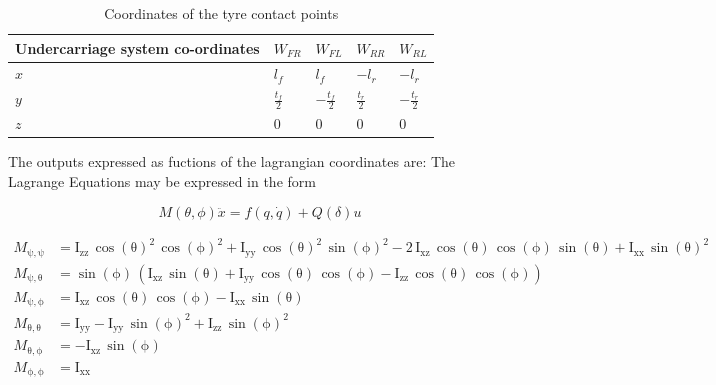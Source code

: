 \begin{table}[ht]
  \caption{Coordinates of the tyre contact points} %
  \centering %
  \begin{tabular}{l l l l l} %
    \hline\hline %
    Undercarriage system co-ordinates & $W_{FR}$ & $W_{FL}$ & $W_{RR}$ & $W_{RL}$ \\ [0.5ex] %
    \hline %
    $ x$ & $ l_f$ & $ l_f$ & $-l_r $ & $-l_r $\\ %
    $ y$ & $ \frac{t_f}{2} $ & $ -\frac{t_f}{2}$ & $ \frac{t_r}{2}$ & $ -\frac{t_r}{2}$\\ %
    $ z$ & $ 0 $& $ 0 $ & $ 0$ & $ 0$ \\ [1ex] %
    \hline %
  \end{tabular}
  \label{table:contactpoints} %
\end{table}

The outputs expressed as fuctions of the lagrangian coordinates are:
The Lagrange Equations may be expressed in the form

$$M(\theta,\phi)\ddot x = f(q, \dot q) + Q(\delta)u$$

\begin{align*}
  M_{\mathrm{\psi},\mathrm{\psi}}&=\mathrm{I_{zz}}\,{\cos\left(\mathrm{\theta}\right)}^2\,{\cos\left(\mathrm{\phi}\right)}^2+\mathrm{I_{yy}}\,{\cos\left(\mathrm{\theta}\right)}^2\,{\sin\left(\mathrm{\phi}\right)}^2-2\,\mathrm{I_{xz}}\,\cos\left(\mathrm{\theta}\right)\,\cos\left(\mathrm{\phi}\right)\,\sin\left(\mathrm{\theta}\right)+\mathrm{I_{xx}}\,{\sin\left(\mathrm{\theta}\right)}^2 \\
  M_{\mathrm{\psi},\mathrm{\theta}}&=\sin\left(\mathrm{\phi}\right)\,\left(\mathrm{I_{xz}}\,\sin\left(\mathrm{\theta}\right)+\mathrm{I_{yy}}\,\cos\left(\mathrm{\theta}\right)\,\cos\left(\mathrm{\phi}\right)-\mathrm{I_{zz}}\,\cos\left(\mathrm{\theta}\right)\,\cos\left(\mathrm{\phi}\right)\right) \\
  M_{\mathrm{\psi},\mathrm{\phi}}&=\mathrm{I_{xz}}\,\cos\left(\mathrm{\theta}\right)\,\cos\left(\mathrm{\phi}\right)-\mathrm{I_{xx}}\,\sin\left(\mathrm{\theta}\right) \\
  M_{\mathrm{\theta},\mathrm{\theta}}&=\mathrm{I_{yy}}-\mathrm{I_{yy}}\,{\sin\left(\mathrm{\phi}\right)}^2+\mathrm{I_{zz}}\,{\sin\left(\mathrm{\phi}\right)}^2 \\
  M_{\mathrm{\theta},\mathrm{\phi}}&=-\mathrm{I_{xz}}\,\sin\left(\mathrm{\phi}\right) \\
  M_{\mathrm{\phi},\mathrm{\phi}}&=\mathrm{I_{xx}}
\end{align*}


